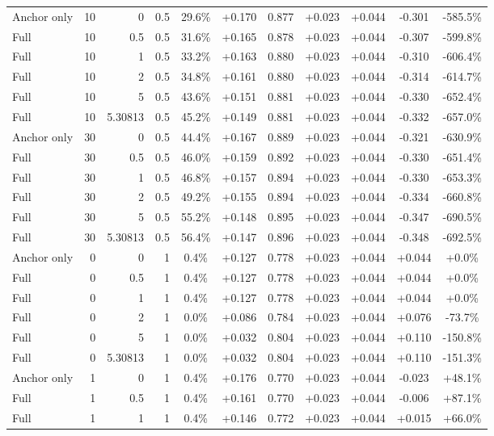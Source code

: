 \begin{table}[htbp]
\begin{tabular}{lrrrccccccc}
Anchor only & 10 & 0 & 0.5 & 29.6\% & +0.170 & 0.877 & +0.023 & +0.044 & -0.301 & -585.5\% \\
Full & 10 & 0.5 & 0.5 & 31.6\% & +0.165 & 0.878 & +0.023 & +0.044 & -0.307 & -599.8\% \\
Full & 10 & 1 & 0.5 & 33.2\% & +0.163 & 0.880 & +0.023 & +0.044 & -0.310 & -606.4\% \\
Full & 10 & 2 & 0.5 & 34.8\% & +0.161 & 0.880 & +0.023 & +0.044 & -0.314 & -614.7\% \\
Full & 10 & 5 & 0.5 & 43.6\% & +0.151 & 0.881 & +0.023 & +0.044 & -0.330 & -652.4\% \\
Full & 10 & 5.30813 & 0.5 & 45.2\% & +0.149 & 0.881 & +0.023 & +0.044 & -0.332 & -657.0\% \\
Anchor only & 30 & 0 & 0.5 & 44.4\% & +0.167 & 0.889 & +0.023 & +0.044 & -0.321 & -630.9\% \\
Full & 30 & 0.5 & 0.5 & 46.0\% & +0.159 & 0.892 & +0.023 & +0.044 & -0.330 & -651.4\% \\
Full & 30 & 1 & 0.5 & 46.8\% & +0.157 & 0.894 & +0.023 & +0.044 & -0.330 & -653.3\% \\
Full & 30 & 2 & 0.5 & 49.2\% & +0.155 & 0.894 & +0.023 & +0.044 & -0.334 & -660.8\% \\
Full & 30 & 5 & 0.5 & 55.2\% & +0.148 & 0.895 & +0.023 & +0.044 & -0.347 & -690.5\% \\
Full & 30 & 5.30813 & 0.5 & 56.4\% & +0.147 & 0.896 & +0.023 & +0.044 & -0.348 & -692.5\% \\
Anchor only & 0 & 0 & 1 & 0.4\% & +0.127 & 0.778 & +0.023 & +0.044 & +0.044 & +0.0\% \\
Full & 0 & 0.5 & 1 & 0.4\% & +0.127 & 0.778 & +0.023 & +0.044 & +0.044 & +0.0\% \\
Full & 0 & 1 & 1 & 0.4\% & +0.127 & 0.778 & +0.023 & +0.044 & +0.044 & +0.0\% \\
Full & 0 & 2 & 1 & 0.0\% & +0.086 & 0.784 & +0.023 & +0.044 & +0.076 & -73.7\% \\
Full & 0 & 5 & 1 & 0.0\% & +0.032 & 0.804 & +0.023 & +0.044 & +0.110 & -150.8\% \\
Full & 0 & 5.30813 & 1 & 0.0\% & +0.032 & 0.804 & +0.023 & +0.044 & +0.110 & -151.3\% \\
Anchor only & 1 & 0 & 1 & 0.4\% & +0.176 & 0.770 & +0.023 & +0.044 & -0.023 & +48.1\% \\
Full & 1 & 0.5 & 1 & 0.4\% & +0.161 & 0.770 & +0.023 & +0.044 & -0.006 & +87.1\% \\
Full & 1 & 1 & 1 & 0.4\% & +0.146 & 0.772 & +0.023 & +0.044 & +0.015 & +66.0\% \\

\end{tabular}
\end{table}
